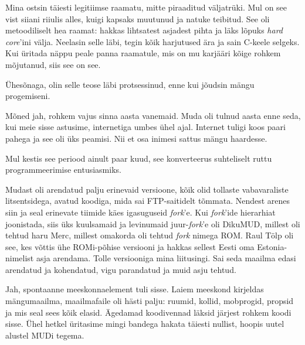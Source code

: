 Mina ostsin täiesti legitiimse raamatu, mitte 
piraaditud väljatrüki. Mul on see vist siiani riiulis alles, kuigi kapsaks 
muutunud ja natuke teibitud. See oli metoodiliselt hea raamat: 
hakkas lihtsatest asjadest pihta ja läks lõpuks \emph{hard core}'ini 
välja. Neelasin selle läbi, tegin kõik harjutused ära ja 
sain C-keele selgeks. Kui üritada näppu peale panna 
raamatule, mis on mu karjääri kõige rohkem mõjutanud, siis see on 
see. 

Ühesõnaga, olin selle teose läbi protsessinud, enne kui jõudsin mängu 
progemiseni.


Mõned jah, rohkem vajus sinna aasta vanemaid. Muda 
oli tulnud aasta enne seda, kui meie sisse astusime, internetiga umbes 
ühel ajal. Internet tuligi koos paari 
pahega ja see oli üks peamisi. Nii et osa inimesi sattus mängu haardesse.


Mul kestis see periood ainult paar kuud, see konverteerus suhteliselt ruttu 
programmeerimise entusiasmiks. 


Mudast oli arendatud palju erinevaid versioone, kõik 
olid tollaste vabavaraliste litsentsidega, avatud koodiga, mida sai 
FTP-saitidelt tõmmata. Nendest arenes siin ja seal erinevate tiimide 
käes igasuguseid \emph{fork}'e. 
Kui \emph{fork}'ide hierarhiat 
joonistada, siis üks kuulsamaid ja levinumaid juur-\emph{fork}'e oli 
DikuMUD, millest oli tehtud haru Merc, 
millest omakorda oli tehtud \emph{fork} nimega ROM. Raul Tölp 
oli see, kes võttis ühe ROMi-põhise versiooni ja hakkas sellest Eesti 
oma Estonia-nimelist asja arendama. Tolle versiooniga mina liitusingi. Sai seda maailma edasi arendatud ja kohendatud, vigu parandatud ja muid asju tehtud. 


Jah, spontaanne meeskonnaelement tuli sisse. Laiem meeskond kirjeldas
mängumaailma, maailmafaile oli hästi palju: 
ruumid, kollid, mobprogid, propsid ja mis seal sees kõik elasid. 
Ägedamad koodivennad läksid järjest rohkem koodi 
sisse. Ühel hetkel üritasime mingi bandega hakata täiesti nullist, 
hoopis uutel alustel MUDi tegema. 

